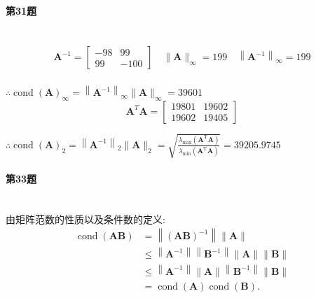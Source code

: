 \documentclass[a4paper]{article}
\begin{document}
\paragraph{第31题}~{}
\\
\begin{equation}
    \begin{array}{l}\boldsymbol{A}^{-1}=\left[\begin{array}{ll}-98 & 99 \\ 99 & -100\end{array}\right]\quad \|\boldsymbol{A}\|_{\infty}=199 \quad \left\|\boldsymbol{A}^{-1}\right\|_{\infty}=199 \\ \end{array} \nonumber
\end{equation} \par
\quad \quad \quad \quad \quad $\therefore \operatorname{cond}(\boldsymbol{A})_{\infty}=\left\|\boldsymbol{A}^{-1}\right\|_{\infty}\|\boldsymbol{A}\|_{\infty}=39601$
\begin{equation}
    \boldsymbol{A}^{T} \boldsymbol{A}=\left[\begin{array}{llll}19801 & 19 602 \\ 19602 & 19405\end{array}\right] \nonumber
\end{equation} \par
\quad \quad \quad \quad \quad $\therefore \operatorname{cond}(\boldsymbol{A})_{2} =\left\|\boldsymbol{A}^{-1}\right\|_{2}\|\boldsymbol{A}\|_{2}=\sqrt{\frac{\lambda_{\max }\left(\boldsymbol{A}^{\mathrm{T}} \boldsymbol{A}\right)}{\lambda_{\min }\left(\boldsymbol{A}^{\mathrm{T}} \boldsymbol{A}\right)}} =39205.9745$

\paragraph{第33题}~{}
\\

由矩阵范数的性质以及条件数的定义:
\begin{equation}
    \begin{aligned} \operatorname{cond}(\boldsymbol{A B}) & =\left\|(\boldsymbol{A} \boldsymbol{B})^{-1}\right\|\|\boldsymbol{A}\| \\ & \leqslant\left\|\boldsymbol{A}^{-1}\right\|\left\|\boldsymbol{B}^{-1}\right\|\|\boldsymbol{A}\|\|\boldsymbol{B}\| \\ & \leqslant\left\|\boldsymbol{A}^{-1}\right\|\|\boldsymbol{A}\|\left\|\boldsymbol{B}^{-1}\right\|\|\boldsymbol{B}\| \\ & =\operatorname{cond}(\boldsymbol{A}) \operatorname{cond}(\boldsymbol{B}) .\end{aligned} \nonumber
\end{equation}\par
\end{document}
